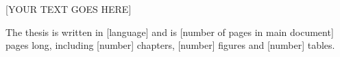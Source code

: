 [YOUR TEXT GOES HERE]

The thesis is written in [language] and is [number of pages in main document] pages long, including [number] chapters, [number] figures and [number] tables.